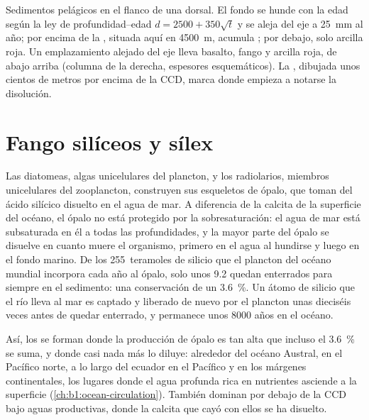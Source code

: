 \begin{omfigure}
{\small Sedimentos pelágicos en el flanco de una dorsal. El fondo se hunde con la edad según la ley de profundidad--edad $d = 2500 + 350\sqrt t$ y se aleja del eje a
\qty{25}{mm} al año; por encima de la , situada aquí en \qty{4500}{m}, acumula ; por debajo, solo arcilla roja. Un
emplazamiento alejado del eje lleva basalto, fango y arcilla roja, de abajo arriba (columna de la derecha, espesores esquemáticos). La , dibujada unos cientos de metros
por encima de la CCD, marca donde empieza a notarse la disolución.}
\label{fig:b1:chemical-biogenic-sediments:flank}
\end{omfigure}

\section{Fango silíceos y sílex}\label{sec:b1:chemical-biogenic-sediments:silica}

Las diatomeas, algas unicelulares del plancton, y los radiolarios, miembros unicelulares del zooplancton, construyen sus esqueletos de ópalo, que toman del ácido silícico disuelto en el agua
de mar. A diferencia de la calcita de la superficie del océano, el ópalo no está protegido por la sobresaturación: el agua de mar está subsaturada en él a todas las profundidades, y la mayor parte
del ópalo se disuelve en cuanto muere el organismo, primero en el agua al hundirse y luego en el fondo marino. De los \num{255}~teramoles de silicio que el plancton del océano mundial incorpora
cada año al ópalo, solo unos 9.2 quedan enterrados para siempre en el sedimento: una conservación de un \qty{3.6}{\%}. Un átomo de silicio que el río lleva al mar es captado y liberado de nuevo por el
plancton unas dieciséis veces antes de quedar enterrado, y permanece unos \num{8000} años en el océano.

Así, los  se forman donde la producción de ópalo es tan alta que incluso el \qty{3.6}{\%} se suma, y donde casi nada más lo diluye: alrededor del océano Austral, en el Pacífico norte, a lo
largo del ecuador en el Pacífico y en los márgenes continentales, los lugares donde el agua profunda rica en nutrientes asciende a la superficie (\cref{ch:b1:ocean-circulation}). También dominan
por debajo de la CCD bajo aguas productivas, donde la calcita que cayó con ellos se ha disuelto.

